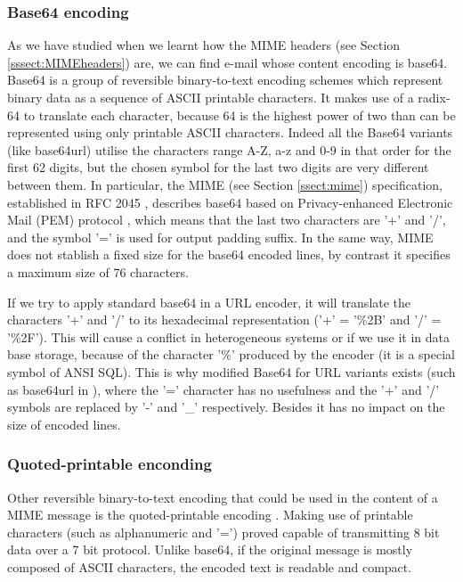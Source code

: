 \subsubsection{Base64 encoding} \label{sssect:base64}
As we have studied when we learnt how the MIME headers (see Section \ref{sssect:MIMEheaders}) are, we can find e-mail whose content encoding is base64. Base64 \citep{wikibase64, rfc4648} is a group of reversible binary-to-text encoding schemes which represent binary data as a sequence of ASCII printable characters. It makes use of a radix-64 to translate each character, because 64 is the highest power of two than can be represented using only printable ASCII characters. Indeed all the Base64 variants (like base64url) utilise the characters range A-Z, a-z and 0-9 in that order for the first 62 digits, but the chosen symbol for the last two digits are very different between them. In particular, the MIME (see Section \ref{ssect:mime}) specification, established in RFC 2045 \citep{rfc2045}, describes base64 based on  Privacy-enhanced Electronic Mail (PEM) protocol \citep{wikipem, rfc7468}, which means that the last two characters are '+' and '/', and the symbol '=' is used for output padding suffix. In the same way, MIME does not stablish a fixed size for the base64 encoded lines, by contrast it specifies a maximum size of 76 characters.

If we try to apply standard base64 in a URL encoder, it will translate the characters '+' and '/' to its hexadecimal representation ('+' = '\%2B' and '/' = '\%2F'). This will cause a conflict in heterogeneous systems or if we use it in data base storage, because of the character '\%' produced by the encoder (it is a special symbol of ANSI SQL). This is why modified Base64 for URL variants exists (such as base64url in \cite{rfc4648}), where the '=' character has no usefulness and the '+' and '/' symbols are replaced by '-' and '\_' respectively. Besides it has no impact on the size of encoded lines.

\subsubsection{Quoted-printable enconding} \label{sssect:quot-p}
Other reversible binary-to-text encoding that could be used in the content of a MIME message is the quoted-printable encoding \citep{wikiquotprint, rfc1521}. Making use of printable characters (such as alphanumeric and '=') proved capable of transmitting 8 bit data over a 7 bit protocol. Unlike base64, if the original message is mostly composed of ASCII characters, the encoded text is readable and compact.

